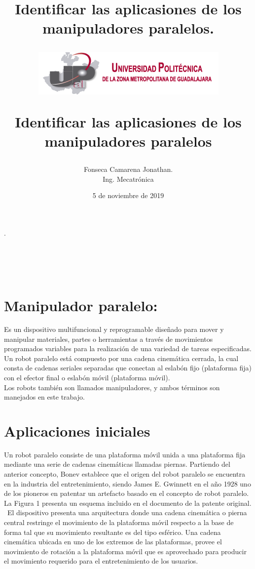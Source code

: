 \documentclass[letter,openright,12pt,spanish]{report}
\title{\textbf{Identificar las aplicasiones de los manipuladores paralelos.}}
\title{\begin{center}
\includegraphics[scale=1.5]{Escudo.png} 
\end{center}Identificar las aplicasiones de los manipuladores paralelos}
\author{Fonseca Camarena Jonathan.\\
		Ing. Mecatr\'onica}
\date{5 de noviembre de 2019}
\begin{document}
\maketitle
\tableofcontents
.\\\\\\\\\
\section{Manipulador paralelo:} 

Es un dispositivo multifuncional y reprogramable diseñado para mover y manipular materiales, partes o herramientas a través de movimientos programados variables para la realización de una variedad de tareas especificadas.\\
Un robot paralelo está compuesto por una cadena cinemática cerrada, la cual consta de cadenas seriales separadas que conectan al eslabón fijo (plataforma fija) con el efector final o eslabón móvil (plataforma móvil).\\
Los robots también son llamados manipuladores, y ambos términos son manejados en este trabajo.\\
\section{Aplicaciones iniciales}
Un robot paralelo consiste de una plataforma móvil unida a una plataforma fija mediante una serie
de cadenas cinemáticas llamadas piernas. Partiendo del anterior concepto, Bonev establece que el
origen del robot paralelo se encuentra en la industria del entretenimiento, siendo James E. Gwinnett en
el año 1928 uno de los pioneros en patentar un artefacto basado en el concepto de robot paralelo. La
Figura 1 presenta un esquema incluido en el documento de la patente original. \
El dispositivo 
presenta una arquitectura donde una cadena cinemática o pierna central restringe el movimiento de la
plataforma móvil respecto a la base de forma tal que su movimiento resultante es del tipo esférico. Una
cadena cinemática ubicada en uno de los extremos de las plataformas, provee el movimiento de rotación
a la plataforma móvil que es aprovechado para producir el movimiento requerido para el entretenimiento
de los usuarios.\
\end{document}
